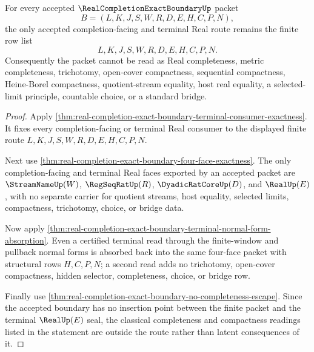 \begin{theorem}
\label{thm:real-completion-exact-boundary-roadmap-off-table-refusal}
For every accepted $\RealCompletionExactBoundaryUp$ packet
$$
B=(L,K,J,S,W,R,D,E,H,C,P,N),
$$
the only accepted completion-facing and terminal Real route remains the finite
row list
$$
L,K,J,S,W,R,D,E,H,C,P,N.
$$
Consequently the packet cannot be read as Real completeness, metric
completeness, trichotomy, open-cover compactness, sequential compactness,
Heine-Borel compactness, quotient-stream equality, host real equality, a
selected-limit principle, countable choice, or a standard bridge.
\end{theorem}
\begin{proof}
Apply \autoref{thm:real-completion-exact-boundary-terminal-consumer-exactness}.
It fixes every completion-facing or terminal Real consumer to the displayed
finite route $L,K,J,S,W,R,D,E,H,C,P,N$.

Next use \autoref{thm:real-completion-exact-boundary-four-face-exactness}. The
only completion-facing and terminal Real faces exported by an accepted packet
are $\StreamNameUp(W)$, $\RegSeqRatUp(R)$, $\DyadicRatCoreUp(D)$, and
$\RealUp(E)$, with no separate carrier for quotient streams, host equality,
selected limits, compactness, trichotomy, choice, or bridge data.

Now apply
\autoref{thm:real-completion-exact-boundary-terminal-normal-form-absorption}.
Even a certified terminal read through the finite-window and pullback normal
forms is absorbed back into the same four-face packet with structural rows
$H,C,P,N$; a second read adds no trichotomy, open-cover compactness, hidden
selector, completeness, choice, or bridge row.

Finally use
\autoref{thm:real-completion-exact-boundary-no-completeness-escape}. Since the
accepted boundary has no insertion point between the finite packet and the
terminal $\RealUp(E)$ seal, the classical completeness and compactness readings
listed in the statement are outside the route rather than latent consequences
of it.
\end{proof}

